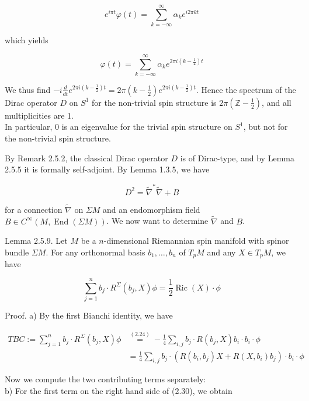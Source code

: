 \documentclass[10pt, letterpaper]{article}
\begin{document}
$$
e^{i \pi t} \varphi(t)=\sum_{k=-\infty}^{\infty} \alpha_{k} e^{i 2 \pi k t}
$$

which yields

$$
\varphi(t)=\sum_{k=-\infty}^{\infty} \alpha_{k} e^{2 \pi i\left(k-\frac{1}{2}\right) t}
$$

We thus find $-i \frac{d}{d t} e^{2 \pi i\left(k-\frac{1}{2}\right) t}=2 \pi\left(k-\frac{1}{2}\right) e^{2 \pi i\left(k-\frac{1}{2}\right) t}$. Hence the spectrum of the Dirac operator $D$ on $S^{1}$ for the non-trivial spin structure is $2 \pi\left(\mathbb{Z}-\frac{1}{2}\right)$, and all multiplicities are 1.\\
In particular, 0 is an eigenvalue for the trivial spin structure on $S^{1}$, but not for the non-trivial spin structure.

By Remark 2.5.2, the classical Dirac operator $D$ is of Dirac-type, and by Lemma 2.5.5 it is formally self-adjoint. By Lemma 1.3.5, we have

$$
D^{2}=\widetilde{\nabla}^{*} \widetilde{\nabla}+B
$$

for a connection $\widetilde{\nabla}$ on $\Sigma M$ and an endomorphism field $B \in C^{\infty}(M, \operatorname{End}(\Sigma M))$. We now want to determine $\widetilde{\nabla}$ and $B$.

Lemma 2.5.9. Let $M$ be a $n$-dimensional Riemannian spin manifold with spinor bundle $\Sigma M$. For any orthonormal basis $b_{1}, \ldots, b_{n}$ of $T_{p} M$ and any $X \in T_{p} M$, we have

$$
\sum_{j=1}^{n} b_{j} \cdot R^{\Sigma}\left(b_{j}, X\right) \phi=\frac{1}{2} \operatorname{Ric}(X) \cdot \phi
$$

Proof. a) By the first Bianchi identity, we have

$$
\begin{aligned}
T B C:=\sum_{j=1}^{n} b_{j} \cdot R^{\Sigma}\left(b_{j}, X\right) \phi & \stackrel{(2.24)}{=}-\frac{1}{4} \sum_{i, j} b_{j} \cdot R\left(b_{j}, X\right) b_{i} \cdot b_{i} \cdot \phi \\
& =\frac{1}{4} \sum_{i, j} b_{j} \cdot\left(R\left(b_{i}, b_{j}\right) X+R\left(X, b_{i}\right) b_{j}\right) \cdot b_{i} \cdot \phi
\end{aligned}
$$

Now we compute the two contributing terms separately:\\
b) For the first term on the right hand side of (2.30), we obtain
\end{document}
